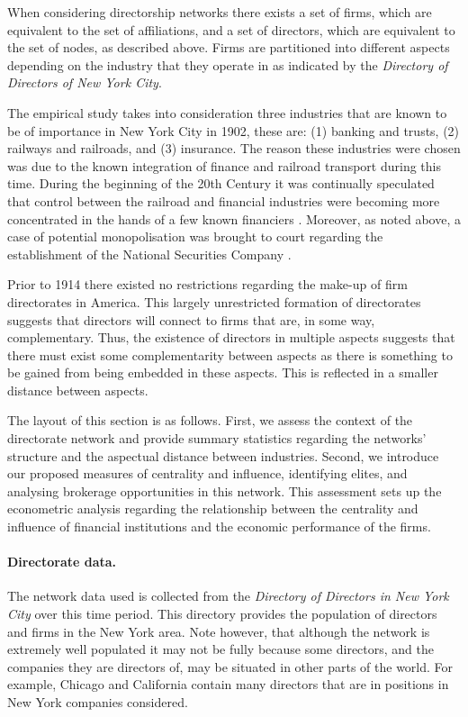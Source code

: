 \documentclass[11pt,fleqn]{article}
\begin{document}
When considering directorship networks there exists a set of firms, which are equivalent to the set of affiliations, and a set of directors, which are equivalent to the set of nodes, as described above. Firms are partitioned into different aspects depending on the industry that they operate in as indicated by the \emph{Directory of Directors of New York City}.

The empirical study takes into consideration three industries that are known to be of importance in New York City in 1902, these are: (1) banking and trusts, (2) railways and railroads, and (3) insurance. The reason these industries were chosen was due to the known integration of finance and railroad transport during this time. During the beginning of the 20th Century it was continually speculated that control between the railroad and financial industries were becoming more concentrated in the hands of a few known financiers \citep{NYT1912FiveMen}. Moreover, as noted above, a case of potential monopolisation was brought to court regarding the establishment of the National Securities Company \citep{NYT1902NorthernSecuritiesCo}.

Prior to 1914 there existed no restrictions regarding the make-up of firm directorates in America. This largely unrestricted formation of directorates suggests that directors will connect to firms that are, in some way, complementary. Thus, the existence of directors in multiple aspects suggests that there must exist some complementarity between aspects as there is something to be gained from being embedded in these aspects. This is reflected in a smaller distance between aspects.


The layout of this section is as follows. First, we assess the context of the directorate network and provide summary statistics regarding the networks' structure and the aspectual distance between industries. Second, we introduce our proposed measures of centrality and influence, identifying elites, and analysing brokerage opportunities in this network. This assessment sets up the econometric analysis regarding the relationship between the centrality and influence of financial institutions and the economic performance of the firms.

\paragraph{Directorate data.}

The network data used is collected from the \emph{Directory of Directors in New York City} over this time period. This directory provides the population of directors and firms in the New York area. Note however, that although the network is extremely well populated it may not be fully because some directors, and the companies they are directors of, may be situated in other parts of the world. For example, Chicago and California contain many directors that are in positions in New York companies considered.
\end{document}
